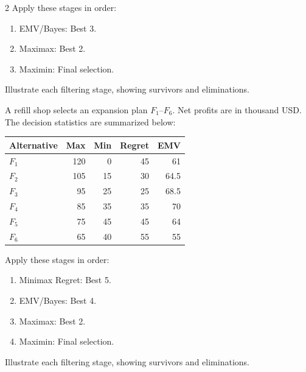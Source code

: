 \begin{multicols}{2}
		Apply these stages in order:
		\begin{enumerate}[leftmargin=*]
			\item EMV/Bayes: Best 3.
			\item Maximax: Best 2.
			\item Maximin: Final selection.
		\end{enumerate}
		Illustrate each filtering stage, showing survivors and eliminations.
		
		
		A refill shop selects an expansion plan $F_1$--$F_6$. Net profits are in thousand USD. The decision statistics are summarized below:
		\vspace{-3mm}
		\begin{center}\small\setlength{\tabcolsep}{4pt}
			\begin{tabular}{lrrrr}\toprule
				Alternative & Max & Min & Regret & EMV\\ \midrule
				$F_1$ & 120 & 0 & 45 & 61\\
				$F_2$ & 105 & 15 & 30 & 64.5\\
				$F_3$ & 95 & 25 & 25 & 68.5\\
				$F_4$ & 85 & 35 & 35 & 70\\
				$F_5$ & 75 & 45 & 45 & 64\\
				$F_6$ & 65 & 40 & 55 & 55\\
				\bottomrule
			\end{tabular}
		\end{center}
		\vspace{-3mm}
		Apply these stages in order:
		\begin{enumerate}[leftmargin=*]
			\item Minimax Regret: Best 5.
			\item EMV/Bayes: Best 4.
			\item Maximax: Best 2.
			\item Maximin: Final selection.
		\end{enumerate}
		Illustrate each filtering stage, showing survivors and eliminations.
		

\end{multicols}
